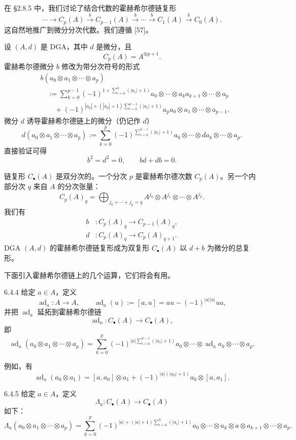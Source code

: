 在 §2.8.5 中，我们讨论了结合代数的霍赫希尔德链复形
\[
\cdots\to C_p(A)\xrightarrow{b}C_{p-1}(A)\xrightarrow{b}\cdots
\xrightarrow{b}C_1(A)\xrightarrow{b}C_0(A).
\]
这自然地推广到微分分次代数。我们遵循 [57]。

设 $(A,d)$ 是 DGA，其中 $d$ 是微分，且
\[
C_p(A)=A^{\otimes p+1}.
\]
霍赫希尔德微分 $b$ 修改为带分次符号的形式
\begin{align*}
&b(a_0\otimes a_1\otimes\cdots\otimes a_p)\\
&\quad:=\sum_{k=0}^{p-1}(-1)^{1+\sum_{i=0}^{k}(|a_i|+1)}
a_0\otimes\cdots\otimes a_ka_{k+1}\otimes\cdots\otimes a_p\\
&\qquad+(-1)^{|a_p|+(|a_p|+1)\sum_{i=0}^{p-1}(|a_i|+1)}
a_pa_0\otimes a_1\otimes\cdots\otimes a_{p-1}.
\end{align*}
微分 $d$ 诱导霍赫希尔德链上的微分（仍记作 $d$）
\[
d(a_0\otimes a_1\otimes\cdots\otimes a_p)
:=\sum_{k=0}^{p}(-1)^{\sum_{i=0}^{k-1}(|a_i|+1)}
a_0\otimes\cdots\otimes da_k\otimes\cdots\otimes a_p.
\]
直接验证可得
\[
b^2=d^2=0,\qquad bd+db=0.
\]

链复形 $C_\bullet(A)$ 是双分次的。一个分次 $p$ 是霍赫希尔德次数 $C_p(A)$。另一个内部分次 $q$ 来自 $A$ 的分次张量：
\[
C_p(A)_q=\bigoplus_{j_0+\cdots+j_p=q}
A^{j_0}\otimes A^{j_1}\otimes\cdots\otimes A^{j_p}.
\]
我们有
\begin{align*}
b&:C_p(A)_q\longrightarrow C_{p-1}(A)_q,\\
d&:C_p(A)_q\longrightarrow C_p(A)_{q+1}.
\end{align*}
DGA $(A,d)$ 的霍赫希尔德链复形成为双复形 $C_\bullet(A)$ 以 $d+b$ 为微分的总复形。

下面引入霍赫希尔德链上的几个运算，它们将会有用。

\begin{definition}{6.4.4}
  给定 $a\in A$，定义
  \[
  \operatorname{ad}_a:A\longrightarrow A,
  \qquad
  \operatorname{ad}_a(u):=[a,u]=au-(-1)^{|a||u|}ua,
  \]
  并把 $\operatorname{ad}_a$ 延拓到霍赫希尔德链
  \[
  \operatorname{ad}_a:C_\bullet(A)\longrightarrow C_\bullet(A),
  \]
  即
  \[
  \operatorname{ad}_a(a_0\otimes a_1\otimes\cdots\otimes a_p)
  =\sum_{k=0}^{p}(-1)^{|a|\sum_{i=0}^{k-1}(|a_i|+1)}
  a_0\otimes\cdots\otimes\operatorname{ad}_aa_k\otimes\cdots\otimes a_p.
  \]
\end{definition}

例如，有
\[
\operatorname{ad}_a(a_0\otimes a_1)
=[a,a_0]\otimes a_1+(-1)^{|a|(|a_0|+1)}a_0\otimes[a,a_1].
\]

\begin{definition}{6.4.5}
  给定 $a\in A$，定义
  \[
  \Lambda_a:C_\bullet(A)\longrightarrow C_\bullet(A)
  \]
  如下：
  \[
  \Lambda_a(a_0\otimes a_1\otimes\cdots\otimes a_p)
  =\sum_{k=0}^{p}(-1)^{|a|+(|a|+1)\sum_{i=0}^{k}(|a_i|+1)}
  a_0\otimes\cdots\otimes a_k\otimes a\otimes a_{k+1}\otimes\cdots\otimes a_p.
  \]
\end{definition}

